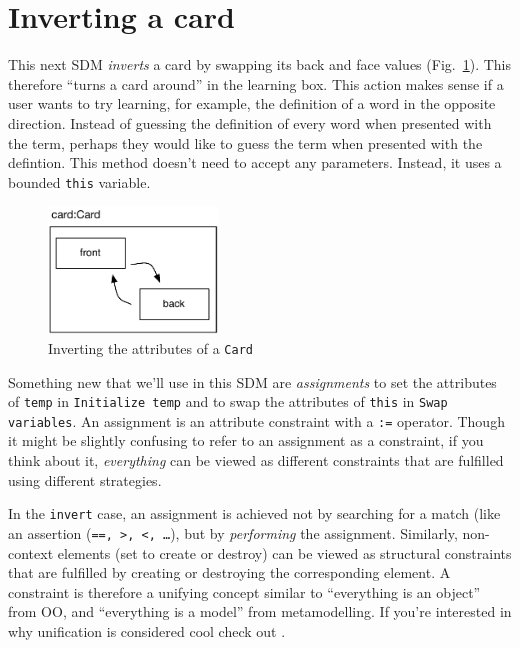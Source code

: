 \newpage
\section{Inverting a card}
\genHeader
\hypertarget{sec:invertCard}{}

This next SDM \emph{inverts} a card by swapping its back and face values (Fig.~\ref{fig:goal_invert}). This therefore ``turns a card around'' in the learning
box. This action makes sense if a user wants to try learning, for example, the definition of a word in the opposite direction. Instead of guessing the
definition of every word when presented with the term, perhaps they would like to guess the term when presented with the defintion. This method doesn't need to
accept any parameters. Instead, it uses a bounded \texttt{this} variable.

\vspace{0.5cm}

\begin{figure}[htbp]
	\centering
    \includegraphics[width=0.4\textwidth]{invert.pdf}
 	\caption{Inverting the attributes of a \texttt{Card}}
 	\label{fig:goal_invert}
\end{figure}
\FloatBarrier

Something new that we'll use in this SDM are \emph{assignments} to set the attributes of \texttt{temp} in \texttt{Initialize temp} and to swap
the attributes of \texttt{this} in \texttt{Swap variables}. An assignment is an attribute constraint with a \texttt{:=} operator. Though it might be slightly
confusing to refer to an assignment as a constraint, if you think about it, \emph{everything} can be viewed as different constraints that are fulfilled using
different strategies. 

In the \texttt{invert} case, an assignment is achieved not by searching for a match (like an assertion (\texttt{==, >, <, \ldots}), but
by \emph{performing} the assignment. Similarly, non-context elements (set to create or destroy) can be viewed as structural constraints that are fulfilled by
creating or destroying the corresponding element.  A constraint is therefore a unifying concept similar to ``everything is an object'' from OO, and ``everything
is a model'' from metamodelling.  If  you're interested in why unification is considered cool check out \cite{BEZ05}.


